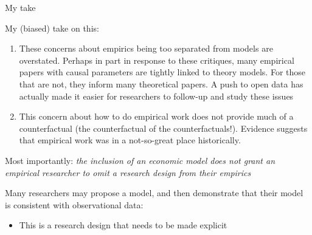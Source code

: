 \documentclass[notes,11pt, aspectratio=169]{beamer}
\newenvironment{wideitemize}{\itemize\addtolength{\itemsep}{10pt}}{\enditemize}
\begin{document}
\begin{frame}{My take}
  \begin{wideitemize}
  \item My (biased) take on this:
    \begin{enumerate}
    \item These concerns about empirics being too separated from
      models are overstated. Perhaps in part in response to these
      critiques, many empirical papers with causal parameters are
      tightly linked to theory models. For those that are not, they
      inform many theoretical papers. A push to open data has actually
      made it easier for researchers to follow-up and study these
      issues
    \item This concern about how to do empirical work does not provide
      much of a counterfactual (the counterfactual of the
      counterfactuals!). Evidence suggests that empirical work was in
      a not-so-great place historically.
    \end{enumerate}
  \item Most importantly: \emph{the inclusion of an economic model does not grant an
      empirical researcher to omit a research design from their empirics}
  \item Many researchers may propose a model, and then demonstrate that their
    model is consistent with observational data:
    \begin{itemize}
    \item This is a research design that needs to be made explicit
    \end{itemize}
  \end{wideitemize}
\end{frame}
\end{document}
